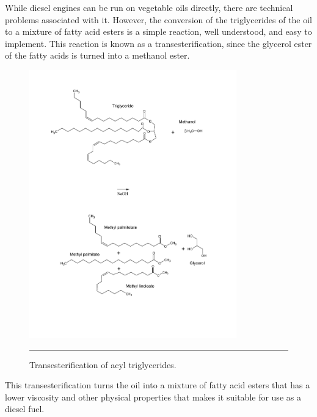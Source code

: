 While diesel engines can be run on vegetable oils directly, there are technical problems associated with it. However, the conversion of the triglycerides of the oil to a mixture of fatty acid esters is a simple reaction, well understood, and easy to implement. This reaction is known as a transesterification, since the glycerol ester of the fatty acids is turned into a methanol ester. 
\begin{figure}[htbp]
	\centering
	\includegraphics[width=0.8\textwidth,natwidth=4.17in,natheight=3.32in]{./Figures/Transesterification.pdf}
	\rule{35em}{0.5pt}
	\caption[Transesterification]{Transesterification of acyl triglycerides.}
	\label{fig:Transesterification}
\end{figure}

This transesterification turns the oil into a mixture of fatty acid esters that has a lower viscosity and other physical properties that makes it suitable for use as a diesel fuel. 

